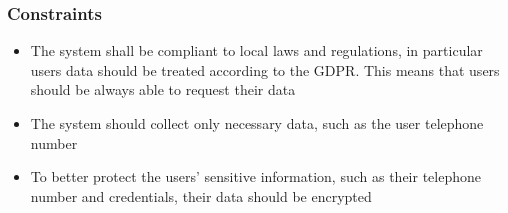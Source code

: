\subsubsection{Constraints}
\begin{itemize}
      \item The system shall be compliant to local laws and regulations, in particular users data should be treated
      according to the GDPR. This means that users should be always able to request their data
      \item The system should collect only necessary data, such as the user telephone number
      \item To better protect the users’ sensitive information, such as their telephone number and credentials, their data should be
      encrypted
\end{itemize}